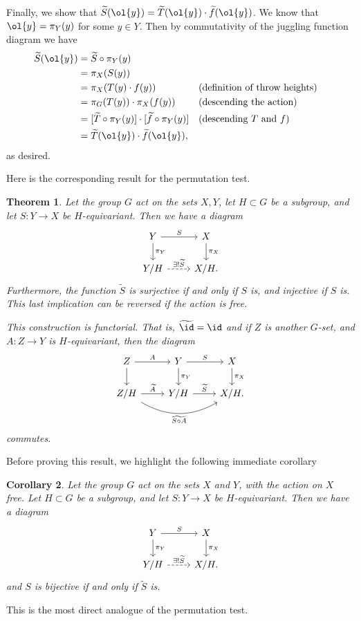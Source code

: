 \documentclass[12nt]{article}
\theoremstyle{plain}
\newtheorem{theorem}{Theorem}
\newtheorem{corollary}[theorem]{Corollary}
\begin{document}
Finally, we show that $\widetilde{S}(\ol{y}) = \widetilde{T}(\ol{y}) \cdot \widetilde{f}(\ol{y})$. We know that $\ol{y} = \pi_Y(y)$ for some $y \in Y$. Then by commutativity of the juggling function diagram we have
\begin{align*}
\widetilde{S}(\ol{y}) &= \widetilde{S} \circ \pi_Y(y) \\
	&= \pi_X(S(y)) \\
	&= \pi_X(T(y) \cdot f(y)) &&\text{(definition of throw heights)}\\
	&= \pi_G(T(y)) \cdot \pi_X(f(y)) && \text{(descending the action)} \\
	&= [\widetilde{T} \circ \pi_Y(y)] \cdot [\widetilde{f} \circ \pi_Y(y)] && \text{(descending $T$ and $f$)} \\
	&= \widetilde{T}(\ol{y}) \cdot \widetilde{f}(\ol{y}),
\end{align*}
as desired.




Here is the corresponding result for the permutation test.
\begin{theorem}\label{permutation_test}
Let the group $G$ act on the sets $X, Y$, let $H \subset G$ be a subgroup, and let $S : Y \to X$ be $H$-equivariant. Then we have a diagram
\[
\begin{tikzcd}
Y \ar[r, "S"] \ar[d, "\pi_Y"] & X \ar[d, "\pi_X"]\\
Y/H \ar[r, dashed, "\exists ! \widetilde{S}"] & X/H.
\end{tikzcd}
\]
Furthermore, the function $\widetilde{S}$ is surjective if and only if $S$ is, and injective if $S$ is. This last implication can be reversed if the action is free. 

This construction is functorial. That is, $\widetilde{\id} = \id$ and if $Z$ is another $G$-set, and $A : Z \to Y$ is $H$-equivariant, then the diagram
\[
\begin{tikzcd}
Z \ar[r, "A"] \ar[d] & Y \ar[r, "S"] \ar[d, "\pi_Y"] & X \ar[d, "\pi_X"]\\
Z/H \ar[r, "\widetilde{A}"] \ar[rr, bend right, "\widetilde{S \circ A}"'] & Y/H \ar[r, "\widetilde{S}"] & X/H.
\end{tikzcd}
\]
commutes.
\end{theorem}
Before proving this result, we highlight the following immediate corollary

\begin{corollary}
Let the group $G$ act on the sets $X$ and $Y$, with the action on $X$ free. Let $H \subset G$ be a subgroup, and let $S : Y \to X$ be $H$-equivariant. Then we have a diagram
\[
\begin{tikzcd}
Y \ar[r, "S"] \ar[d, "\pi_Y"] & X \ar[d, "\pi_X"]\\
Y/H \ar[r, dashed, "\exists ! \widetilde{S}"] & X/H.
\end{tikzcd}
\]
and $S$ is bijective if and only if $\widetilde{S}$ is.
\end{corollary}
This is the most direct analogue of the permutation test. 
\end{document}
